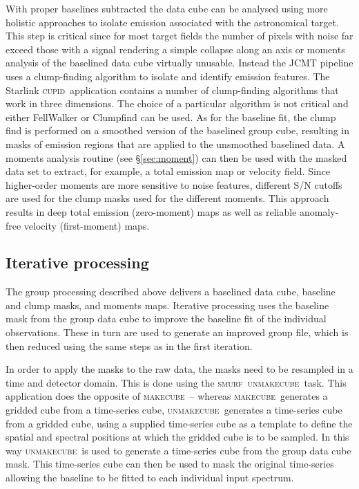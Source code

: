 \documentclass[a4paper,fleqn,usenatbib]{mnras}
\newcommand{\cupid}{\textsc{cupid}}
\newcommand{\smurf}{\textsc{smurf}}
\newcommand{\makecube}{\textsc{makecube}}
\newcommand{\unmakecube}{\textsc{unmakecube}}
\newcommand{\ascl}[1]{\href{http://www.ascl.net/#1}{ascl:#1}}
\begin{document}
With proper baselines subtracted the data cube can be analysed using more
holistic approaches to isolate emission associated with the astronomical
target. This step is critical since for most target fields the number of pixels with
noise far exceed those with a signal rendering a simple collapse along an axis
or moments analysis of the baselined data cube virtually unusable. Instead
the JCMT pipeline uses a clump-finding algorithm to isolate and identify
emission features.
The Starlink \cupid\ application contains
a number of clump-finding algorithms that work in three dimensions.
The choice of a particular algorithm is not critical and either FellWalker \citep{2015FW} or
Clumpfind \citep[][\ascl{1107.014}]{1994ApJ...428..693W} can be used.
As for the baseline fit, the clump find is performed on a smoothed version
of the baselined group cube, resulting in masks of emission regions that
are applied to the unsmoothed baselined data. A moments analysis routine
(see \mbox{\S \ref{sec:moment}}) can then be used with the masked data set to
extract, for example, a total emission map or velocity field. Since higher-order moments are
more sensitive to noise features, different S/N cutoffs are used for the
clump masks used for the different moments. This approach results in deep
total emission (zero-moment) maps as well as reliable anomaly-free
velocity (first-moment) maps.


\subsection{Iterative processing}

The group processing described above delivers a baselined data cube,
baseline and clump masks, and moments maps. Iterative processing uses
the baseline mask from the group data cube to improve the baseline fit
of the individual observations. These in turn are used to generate an improved
group file, which is then reduced using the same steps as in the first iteration.

In order to apply the masks to the raw data, the masks need to be resampled
in a time and detector domain. This is done using the \smurf\ \unmakecube\ task.
This application
does the opposite of \makecube\ -- whereas \makecube\
generates a gridded cube from a time-series cube, \unmakecube\ generates
a time-series cube from a gridded cube, using a supplied time-series cube
as a template to define the spatial and spectral positions at which the
gridded cube is to be sampled. In this way \unmakecube\ is used to generate
a time-series cube from the group data cube mask. This time-series cube can
then be used to mask the original time-series allowing the baseline to be
fitted to each individual input spectrum.
\end{document}

